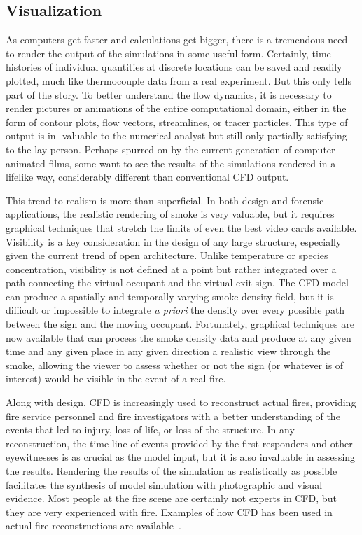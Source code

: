 \documentclass[graybox]{svmult}
\begin{document}
\subsection{Visualization}

As computers get faster and calculations get bigger, there is a tremendous need to render the output of the simulations in some useful form. Certainly, time histories of individual quantities at discrete locations can be saved and readily plotted, much like thermocouple data from a real experiment. But this only tells part of the story. To better understand the flow dynamics, it is necessary to render pictures or animations of the entire computational domain, either in the form of contour plots, flow vectors, streamlines, or tracer particles. This type of output is in- valuable to the numerical analyst but still only partially satisfying to the lay person. Perhaps spurred on by the current generation of computer-animated films, some want to see the results of the simulations rendered in a lifelike way, considerably different than conventional CFD output.

This trend to realism is more than superficial. In both design and forensic applications, the realistic rendering of smoke is very valuable, but it requires graphical techniques that stretch the limits of even the best video cards available. Visibility is a key consideration in the design of any large structure, especially given the current trend of open architecture. Unlike temperature or species concentration, visibility is not defined at a point but rather integrated over a path connecting the virtual occupant and the virtual exit sign. The CFD model can produce a spatially and temporally varying smoke density field, but it is difficult or impossible to integrate {\em a priori} the density over every possible path between the sign and the moving occupant. Fortunately, graphical techniques are now available that can process the smoke density data and produce at any given time and any given place in any given direction a realistic view through the smoke, allowing the viewer to assess whether or not the sign (or whatever is of interest) would be visible in the event of a real fire.

Along with design, CFD is increasingly used to reconstruct  actual  fires,  providing  fire  service  personnel and fire investigators with a better understanding of the events that led to injury, loss of life, or loss of the structure. In any reconstruction, the time line of events provided by the first responders and other eyewitnesses is as crucial as the model input, but it is also invaluable in assessing the results. Rendering the results of the simulation as realistically as possible facilitates the synthesis of model simulation with photographic and visual evidence. Most people at the fire scene are certainly not experts in CFD, but they are very experienced with fire. Examples of how CFD has been used in actual fire reconstructions are available~\cite{Grosshandler, McGrattan:2005, Madrzykowski:2000, Madrzykowski:2004, Christensen}.
\end{document}
